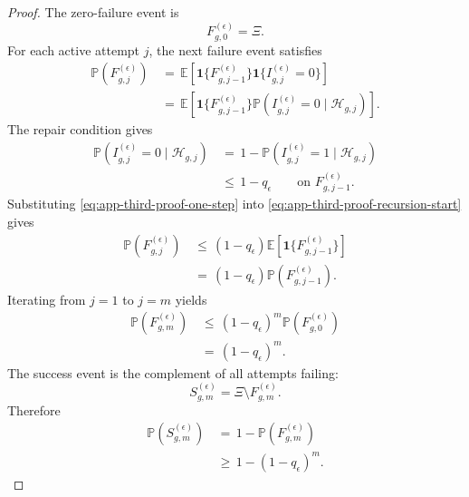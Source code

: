 \documentclass{article} %
\begin{document}
\begin{proof}
The zero-failure event is
\begin{equation}
\label{eq:app-third-proof-base-event}
F_{g,0}^{(\epsilon)}
=
\Xi.
\end{equation}
For each active attempt \(j\), the next failure event satisfies
\begin{align}
\label{eq:app-third-proof-recursion-start}
\mathbb{P}\!\left(F_{g,j}^{(\epsilon)}\right)
&\,=\,
\mathbb{E}\!\left[
\mathbf{1}\{F_{g,j-1}^{(\epsilon)}\}
\mathbf{1}\{I_{g,j}^{(\epsilon)}=0\}
\right]
\\
&\,=\,
\mathbb{E}\!\left[
\mathbf{1}\{F_{g,j-1}^{(\epsilon)}\}
\mathbb{P}\!\left(
I_{g,j}^{(\epsilon)}=0
\mid
\mathcal{H}_{g,j}
\right)
\right].
\end{align}
The repair condition gives
\begin{align}
\label{eq:app-third-proof-one-step}
\mathbb{P}\!\left(
I_{g,j}^{(\epsilon)}=0
\mid
\mathcal{H}_{g,j}
\right)
&\,=\,
1-
\mathbb{P}\!\left(
I_{g,j}^{(\epsilon)}=1
\mid
\mathcal{H}_{g,j}
\right)
\\
&\,\le\,
1-q_{\epsilon}
\qquad
\text{on }F_{g,j-1}^{(\epsilon)}.
\end{align}
Substituting \eqref{eq:app-third-proof-one-step} into \eqref{eq:app-third-proof-recursion-start} gives
\begin{align}
\label{eq:app-third-proof-recursion}
\mathbb{P}\!\left(F_{g,j}^{(\epsilon)}\right)
&\,\le\,
(1-q_{\epsilon})
\mathbb{E}\!\left[
\mathbf{1}\{F_{g,j-1}^{(\epsilon)}\}
\right]
\\
&\,=\,
(1-q_{\epsilon})
\mathbb{P}\!\left(F_{g,j-1}^{(\epsilon)}\right).
\end{align}
Iterating from \(j=1\) to \(j=m\) yields
\begin{align}
\label{eq:app-third-proof-tail}
\mathbb{P}\!\left(F_{g,m}^{(\epsilon)}\right)
&\,\le\,
(1-q_{\epsilon})^{m}
\mathbb{P}\!\left(F_{g,0}^{(\epsilon)}\right)
\\
&\,=\,
(1-q_{\epsilon})^{m}.
\end{align}
The success event is the complement of all attempts failing:
\begin{equation}
\label{eq:app-third-proof-complement}
S_{g,m}^{(\epsilon)}
=
\Xi\setminus F_{g,m}^{(\epsilon)}.
\end{equation}
Therefore
\begin{align}
\label{eq:app-third-proof-success}
\mathbb{P}\!\left(S_{g,m}^{(\epsilon)}\right)
&\,=\,
1-
\mathbb{P}\!\left(F_{g,m}^{(\epsilon)}\right)
\\
&\,\ge\,
1-(1-q_{\epsilon})^{m}.
\end{align}
\end{proof}
\end{document}
